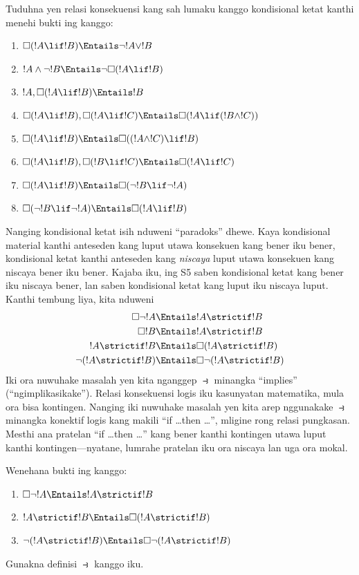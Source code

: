 \documentclass[../../../include/open-logic-section]{subfiles}
\begin{document}
\begin{prob}
  Tuduhna yen relasi konsekuensi kang sah lumaku kanggo kondisional
  ketat kanthi menehi bukti ing  kanggo:
  \begin{enumerate}
  \item  $\Box(!A \lif !B) \Entails \lnot !A \lor !B$
  \item $!A \land \lnot !B \Entails \lnot\Box(!A \lif !B)$
  \item $!A, \Box(!A \lif !B) \Entails !B$
  \item $\Box(!A \lif !B), \Box(!A \lif !C) \Entails \Box(!A \lif (!B
    \land !C))$
  \item $\Box(!A \lif !B) \Entails \Box((!A \land !C) \lif !B)$
  \item $\Box(!A \lif !B), \Box(!B \lif !C) \Entails \Box(!A
    \lif !C)$
  \item $\Box(!A \lif !B) \Entails \Box(\lnot !B \lif \lnot !A)$
  \item $\Box(\lnot !B \lif \lnot !A) \Entails \Box(!A \lif !B)$
  \end{enumerate}
  \end{prob}

Nanging kondisional ketat isih nduweni ``paradoks'' dhewe. Kaya
kondisional material kanthi anteseden kang luput utawa konsekuen
kang bener iku bener, kondisional ketat kanthi anteseden kang
\emph{niscaya} luput utawa konsekuen kang niscaya bener iku bener.
Kajaba iku, ing S5 saben kondisional ketat kang bener iku niscaya
bener, lan saben kondisional ketat kang luput iku niscaya luput.
Kanthi tembung liya, kita nduweni
\begin{align}
  \Box \lnot !A & \Entails !A \strictif !B\\
  \Box !B & \Entails !A \strictif !B\\
  !A \strictif !B& \Entails \Box(!A \strictif !B)\\
  \lnot(!A \strictif !B) & \Entails \Box\lnot(!A \strictif !B)
\end{align}
Iki ora nuwuhake masalah yen kita nganggep $\strictif$ minangka
``implies'' (``ngimplikasikake''). Relasi konsekuensi logis iku
kasunyatan matematika, mula ora bisa kontingen. Nanging iki nuwuhake
masalah yen kita arep nggunakake $\strictif$ minangka konektif
logis kang makili ``if \dots then \dots'', mligine rong relasi
pungkasan. Mesthi ana pratelan ``if \dots then \dots'' kang bener
kanthi kontingen utawa luput kanthi kontingen---nyatane, lumrahe
pratelan iku ora niscaya lan uga ora mokal.

\begin{prob}
  Wenehana bukti ing  kanggo:
  \begin{enumerate}
    \item  $\Box \lnot !A \Entails !A \strictif !B$
    \item $!A \strictif !B \Entails \Box(!A \strictif !B)$
    \item $\lnot(!A \strictif !B)  \Entails \Box\lnot(!A \strictif !B)$
  \end{enumerate}
  Gunakna definisi $\strictif$ kanggo iku.
\end{prob}
\end{document}
